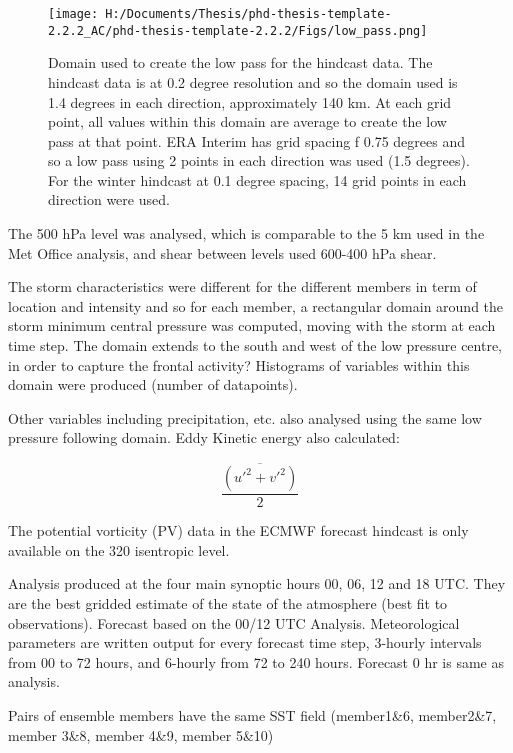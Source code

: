 \begin{figure}
	
	\texttt{[image: H:/Documents/Thesis/phd-thesis-template-2.2.2\_AC/phd-thesis-template-2.2.2/Figs/low\_pass.png]}
	\caption{Domain used to create the low pass for the hindcast data.  The hindcast data is at 0.2 degree resolution and so the domain used is 1.4 degrees in each direction, approximately 140 km. At each grid point, all values within this domain are average to create the low pass at that point. ERA Interim has grid spacing f 0.75 degrees and so a low pass using 2 points in each direction was used (1.5 degrees). For the winter hindcast at 0.1 degree spacing, 14 grid points in each direction were used.}\label{fig:low_pass}
	\centering
\end{figure}


The 500 hPa level was analysed, which is comparable to the 5 km used in the Met Office analysis, and shear between levels used 600-400 hPa shear.

The storm characteristics were different for the different members in term of location and intensity and so for each member, a rectangular domain around the storm minimum central pressure was computed, moving with the storm at each time step. The domain extends to the south and west of the low pressure centre, in order to capture the frontal activity?
Histograms of variables within this domain were produced (number of datapoints).

Other variables including precipitation, etc. also analysed using the same low pressure following domain.
Eddy Kinetic energy also calculated:

\begin{equation} \label{eq_EKE}
\frac{\overline{(u'^{2}+v'^{2})}}{2} 
\end{equation}

The potential vorticity (PV) data in the ECMWF forecast hindcast is only available on the 320 isentropic level. 

Analysis produced at the four main synoptic hours 00, 06, 12 and 18 UTC. They are the best gridded estimate of the state of the atmosphere (best fit to observations). 
Forecast based on the 00/12 UTC Analysis. Meteorological parameters are written output for every forecast time step, 3-hourly intervals from 00 to 72 hours, and 6-hourly from 72 to 240 hours. Forecast 0 hr is same as analysis.

Pairs of ensemble members have the same SST field (member1\&6, member2\&7, member 3\&8, member 4\&9, member 5\&10)


